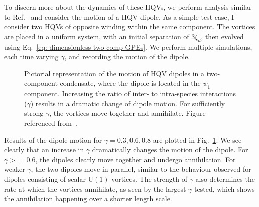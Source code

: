 To discern more about the dynamics of these HQVs, we perform analysis similar to
Ref.~\cite{Kasamatsu2016} and consider the motion of a HQV dipole.
As a simple test case, I consider two HQVs of opposite winding within the same
component.
The vortices are placed in a uniform system, with an initial separation of
\(3\xi_d\), then evolved using Eq.~\eqref{eq: dimensionless-two-comp-GPEs}.
We perform multiple simulations, each time varying \(\gamma \), and recording
the motion of the dipole.

\begin{figure}
    \centering
    \caption[Schematic representation of dipole motion for various \(\gamma \)]
    {\label{fig: HQV-dipole-motion}Pictorial representation of the
        motion of HQV dipoles in a two-component condensate, where the dipole is
        located in the \(\psi_1\) component.
        Increasing the ratio of inter- to intra-species interactions
        (\(\gamma \)) results in a dramatic change of dipole motion.
        For sufficiently strong \(\gamma \), the vortices move together and
        annihilate.
        Figure referenced from~\cite{Kasamatsu2016}.}
\end{figure}
Results of the dipole motion for \(\gamma=0.3, 0.6, 0.8\) are plotted in
Fig.~\ref{fig: HQV-dipole-motion}.
We see clearly that an increase in \(\gamma \) dramatically changes the motion
of the dipole.
For \(\gamma>=0.6\), the dipoles clearly move together and undergo annihilation.
For weaker \(\gamma \), the two dipoles move in parallel, similar to
the behaviour observed for dipoles consisting of scalar \(\mathrm{U}(1)\)
vortices.
The strength of \(\gamma \) also determines the rate at which the vortices
annihilate, as seen by the largest \(\gamma \) tested, which shows the
annihilation happening over a shorter length scale.
